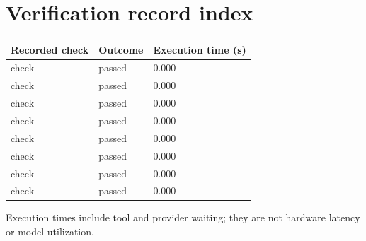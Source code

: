\documentclass[11pt,a4paper]{article}
\begin{document}
\section{Verification record index}

{\small\renewcommand{\arraystretch}{1.18}\begin{longtable}{@{}L{0.57\textwidth}|L{0.16\textwidth}|L{0.17\textwidth}@{}}\toprule

\textbf{Recorded check} & \textbf{Outcome} & \textbf{Execution time (\allowbreak{}s)\allowbreak{}}\\\midrule\endhead

check & passed & 0.000\\[2pt]\hline

check & passed & 0.000\\[2pt]\hline

check & passed & 0.000\\[2pt]\hline

check & passed & 0.000\\[2pt]\hline

check & passed & 0.000\\[2pt]\hline

check & passed & 0.000\\[2pt]\hline

check & passed & 0.000\\[2pt]\hline

check & passed & 0.000\\[2pt]\hline

\bottomrule\end{longtable}}

Execution times include tool and provider waiting; they are not hardware latency or model utilization.
\end{document}
